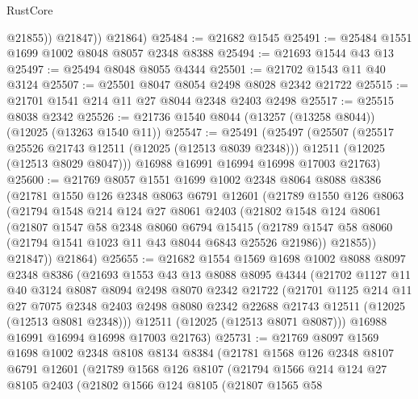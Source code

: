 \begin{lexlean}{RustCore}
\begin{coremodule}
              @21855))
          @21847))
      @21864)
@25484 := @21682 @1545
@25491 := @25484 @1551 @1699 @1002 @8048 @8057 @2348 @8388
@25494 := @21693 @1544 @43 @13
@25497 := @25494 @8048 @8055 @4344
@25501 := @21702 @1543 @11 @40 @3124
@25507 := @25501 @8047 @8054 @2498 @8028 @2342 @21722
@25515 := @21701 @1541 @214 @11 @27 @8044 @2348 @2403 @2498
@25517 := @25515 @8038 @2342
@25526 := @21736 @1540 @8044 (@13257 (@13258 @8044)) (@12025 (@13263 @1540 @11))
@25547 := @25491
    (@25497
      (@25507
        (@25517 @25526 @21743 @12511 (@12025 (@12513 @8039 @2348)))
        @12511
        (@12025 (@12513 @8029 @8047)))
      @16988
      @16991
      @16994
      @16998
      @17003
      @21763)
@25600 := @21769
    @8057
    @1551
    @1699
    @1002
    @2348
    @8064
    @8088
    @8386
    (@21781
      @1550
      @126
      @2348
      @8063
      @6791
      @12601
      (@21789
        @1550
        @126
        @8063
        (@21794
          @1548
          @214
          @124
          @27
          @8061
          @2403
          (@21802
            @1548
            @124
            @8061
            (@21807
              @1547
              @58
              @2348
              @8060
              @6794
              @15415
              (@21789 @1547 @58 @8060 (@21794 @1541 @1023 @11 @43 @8044 @6843 @25526 @21986))
              @21855))
          @21847))
      @21864)
@25655 := @21682
    @1554
    @1569
    @1698
    @1002
    @8088
    @8097
    @2348
    @8386
    (@21693
      @1553
      @43
      @13
      @8088
      @8095
      @4344
      (@21702
        @1127
        @11
        @40
        @3124
        @8087
        @8094
        @2498
        @8070
        @2342
        @21722
        (@21701
          @1125
          @214
          @11
          @27
          @7075
          @2348
          @2403
          @2498
          @8080
          @2342
          @22688
          @21743
          @12511
          (@12025 (@12513 @8081 @2348)))
        @12511
        (@12025 (@12513 @8071 @8087)))
      @16988
      @16991
      @16994
      @16998
      @17003
      @21763)
@25731 := @21769
    @8097
    @1569
    @1698
    @1002
    @2348
    @8108
    @8134
    @8384
    (@21781
      @1568
      @126
      @2348
      @8107
      @6791
      @12601
      (@21789
        @1568
        @126
        @8107
        (@21794
          @1566
          @214
          @124
          @27
          @8105
          @2403
          (@21802
            @1566
            @124
            @8105
            (@21807
              @1565
              @58

\end{coremodule}
\end{lexlean}

